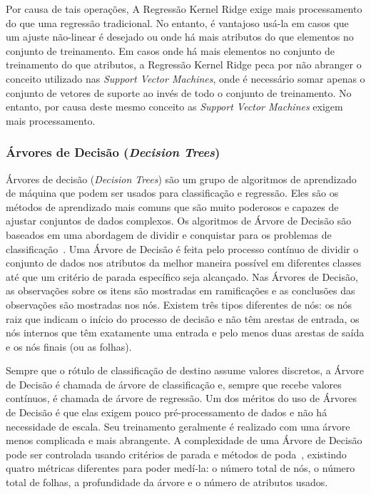 \documentclass[Portugues,Final]{ic-tese-v3}
\begin{document}
Por causa de tais operações, A Regressão Kernel Ridge exige mais processamento do que uma regressão tradicional. No entanto, é vantajoso usá-la em casos que um ajuste não-linear é desejado ou onde há mais atributos do que elementos no conjunto de treinamento. Em casos onde há mais elementos no conjunto de treinamento do que atributos, a Regressão Kernel Ridge peca por não abranger o conceito utilizado nas \textit{Support Vector Machines}, onde é necessário somar apenas o conjunto de vetores de suporte ao invés de todo o conjunto de treinamento. No entanto, por causa deste mesmo conceito as \textit{Support Vector Machines} exigem mais processamento.

\subsubsection{Árvores de Decisão (\textit{Decision Trees})}

Árvores de decisão (\textit{Decision Trees}) são um grupo de algoritmos de aprendizado de máquina que podem ser usados para classificação e regressão. Eles são os métodos de aprendizado mais comuns que são muito poderosos e capazes de ajustar conjuntos de dados complexos. Os algoritmos de Árvore de Decisão são baseados em uma abordagem de dividir e conquistar para os problemas de classificação~\cite{Witten_2016}. Uma Árvore de Decisão é feita pelo processo contínuo de dividir o conjunto de dados nos atributos da melhor maneira possível em diferentes classes até que um critério de parada específico seja alcançado. Nas Árvores de Decisão, as observações sobre os itens são mostradas em ramificações e as conclusões das observações são mostradas nos nós. Existem três tipos diferentes de nós: os nós raiz que indicam o início do processo de decisão e não têm arestas de entrada, os nós internos que têm exatamente uma entrada e pelo menos duas arestas de saída e os nós finais (ou as folhas).

Sempre que o rótulo de classificação de destino assume valores discretos, a Árvore de Decisão é chamada de árvore de classificação e, sempre que recebe valores contínuos, é chamada de árvore de regressão. Um dos méritos do uso de Árvores de Decisão é que elas exigem pouco pré-processamento de dados e não há necessidade de escala. Seu treinamento geralmente é realizado com uma árvore menos complicada e mais abrangente. A complexidade de uma Árvore de Decisão pode ser controlada usando critérios de parada e métodos de poda~\cite{Rokach_2005}, existindo quatro métricas diferentes para poder medí-la: o número total de nós, o número total de folhas, a profundidade da árvore e o número de atributos usados.
\end{document}
